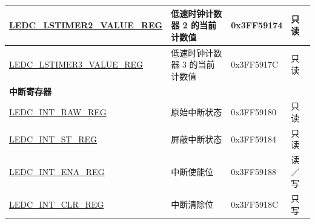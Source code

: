 \begin{longtable}{ | p{5cm} | p{7cm} | p{2.2cm} | p{1.2cm} | }
\hyperref[regdesc:LEDCHSTIMERnVALUEREG]{LEDC\_LSTIMER2\_VALUE\_REG} & 低速时钟计数器 2 的当前计数值 & 0x3FF59174 & 只读 \\ \hline
\hyperref[regdesc:LEDCHSTIMERnVALUEREG]{LEDC\_LSTIMER3\_VALUE\_REG} & 低速时钟计数器 3 的当前计数值 & 0x3FF5917C & 只读 \\ \hline
\multicolumn{4}{|l|}{\textbf{中断寄存器}} \\ \hline
\hyperref[regdesc:LEDCINTRAWREG]{LEDC\_INT\_RAW\_REG} & 原始中断状态 & 0x3FF59180 & 只读 \\ \hline
\hyperref[regdesc:LEDCINTSTREG]{LEDC\_INT\_ST\_REG} & 屏蔽中断状态 & 0x3FF59184 & 只读 \\ \hline
\hyperref[regdesc:LEDCINTENAREG]{LEDC\_INT\_ENA\_REG} & 中断使能位 & 0x3FF59188 & 读／写 \\ \hline
\hyperref[regdesc:LEDCINTCLRREG]{LEDC\_INT\_CLR\_REG} & 中断清除位 & 0x3FF5918C & 只写 \\ \hline
\end{longtable}
